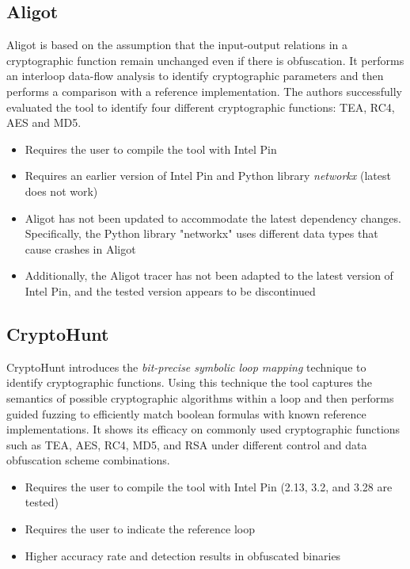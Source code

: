 \subsection{Aligot} 

 Aligot \cite{calvet2012aligot}  is based on the assumption that the input-output relations in a cryptographic function remain unchanged
even if there is obfuscation. It performs an interloop data-flow analysis to identify cryptographic parameters and then performs a comparison
with a reference implementation. The authors successfully evaluated the tool to identify four different cryptographic functions: TEA, RC4, AES and MD5.

\begin{itemize}
  \item Requires the user to compile the tool with Intel Pin
  \item Requires an earlier version of Intel Pin and Python library \textit{networkx} (latest does not work)
\end{itemize}

\begin{itemize}
  \item Aligot has not been updated to accommodate the latest dependency changes. Specifically, the Python library "networkx" uses different data types that cause crashes in Aligot
  \item Additionally, the Aligot tracer has not been adapted to the latest version of Intel Pin, and the tested version appears to be discontinued
\end{itemize}

\subsection{CryptoHunt} 
 CryptoHunt \cite{xu2017cryptographic} introduces the \textit{bit-precise symbolic loop mapping} technique to identify cryptographic functions. Using this technique the tool captures the semantics of possible cryptographic algorithms within a loop and then performs guided fuzzing to efficiently match boolean formulas with known reference implementations. It shows its efficacy on commonly used cryptographic functions such as TEA, AES, RC4, MD5, and RSA under different control and data obfuscation scheme combinations.

\begin{itemize}
  \item Requires the user to compile the tool with Intel Pin (2.13, 3.2, and 3.28 are tested)
  \item Requires the user to indicate the reference loop
  \item Higher accuracy rate and detection results in obfuscated binaries
\end{itemize}

